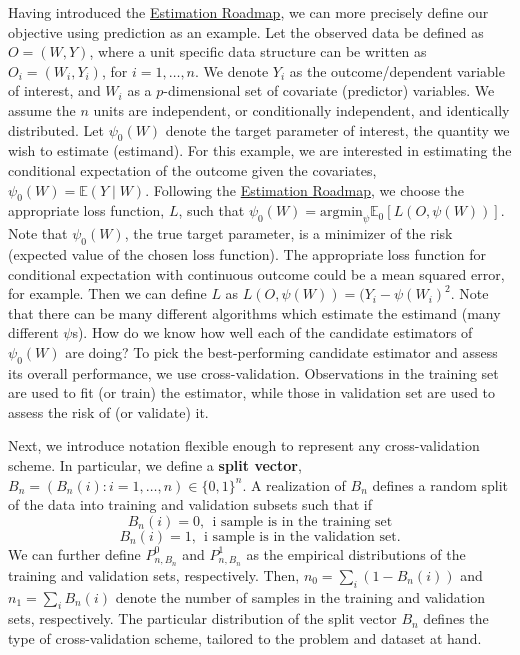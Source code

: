 \documentclass[
  12pt, krantz2,
]{krantz}
\newcommand{\E}{\mathbb{E}}
\newcommand{\1}{\mathbbm{1}}
\theoremstyle{definition}
\theoremstyle{definition}
\theoremstyle{definition}
\theoremstyle{definition}
\theoremstyle{remark}
\begin{document}
Having introduced the \protect\hyperlink{roadmap}{Estimation Roadmap}, we can more precisely
define our objective using prediction as an example. Let the observed data be
defined as \(O = (W, Y)\), where a unit specific data structure can be written as
\(O_i = (W_i, Y_i)\), for \(i = 1, \ldots, n\). We denote \(Y_i\) as the
outcome/dependent variable of interest, and \(W_i\) as a \(p\)-dimensional set of
covariate (predictor) variables. We assume the \(n\) units are independent, or
conditionally independent, and identically distributed. Let \(\psi_0(W)\) denote
the target parameter of interest, the quantity we wish to estimate (estimand).
For this example, we are interested in estimating the conditional expectation of
the outcome given the covariates, \(\psi_0(W) = \E(Y \mid W)\). Following the
\protect\hyperlink{roadmap}{Estimation Roadmap}, we choose the appropriate loss function, \(L\),
such that \(\psi_0(W) = \text{argmin}_{\psi} \E_0[L(O, \psi(W))]\). Note that
\(\psi_0(W)\), the true target parameter, is a minimizer of the risk (expected
value of the chosen loss function). The appropriate loss function for
conditional expectation with continuous outcome could be a mean squared error,
for example. Then we can define \(L\) as \(L(O, \psi(W)) = (Y_i -\psi(W_i)^2\). Note
that there can be many different algorithms which estimate the estimand (many
different \(\psi\)s). How do we know how well each of the candidate estimators of
\(\psi_0(W)\) are doing? To pick the best-performing candidate estimator and
assess its overall performance, we use cross-validation. Observations in the
training set are used to fit (or train) the estimator, while those in validation
set are used to assess the risk of (or validate) it.

Next, we introduce notation flexible enough to represent any cross-validation
scheme. In particular, we define a \textbf{split vector}, \(B_n = (B_n(i): i = 1, \ldots, n) \in \{0,1\}^n\).
A realization of \(B_n\) defines a random split of the data into training and
validation subsets such that if
\[B_n(i) = 0, \ \ \text{i sample is in the training set}\]
\[B_n(i) = 1, \ \ \text{i sample is in the validation set.}\]
We can further define \(P_{n, B_n}^0\) and \(P_{n, B_n}^1\) as the empirical
distributions of the training and validation sets, respectively. Then, \(n_0 = \sum_i (1 - B_n(i))\) and \(n_1 = \sum_i B_n(i)\) denote the number of samples in
the training and validation sets, respectively. The particular distribution
of the split vector \(B_n\) defines the type of cross-validation scheme, tailored
to the problem and dataset at hand.
\end{document}

